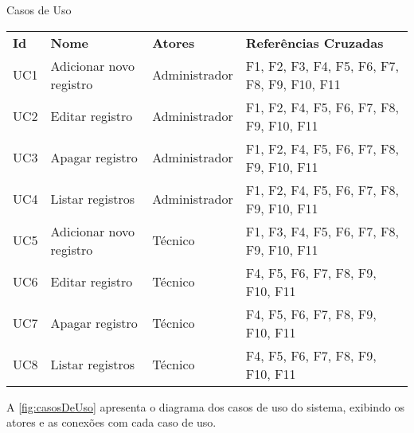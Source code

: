 \begin{tabframed}[htb]
  \caption{Casos de Uso}
  \label{quad:casosDeUso}
  \renewcommand{\arraystretch}{1.5}
  \begin{tabular}{|l|l|l|l|}
    \cline{1-4}
    \textbf{Id}             &
    \textbf{Nome}           &
    \textbf{Atores}         &
    \textbf{Referências Cruzadas}
    \\

    \cline{1-4}
    UC1                     &
    Adicionar novo registro &
    Administrador           &
    F1, F2, F3, F4, F5, F6, F7, F8, F9, F10, F11
    \\

    \cline{1-4}
    UC2                     &
    Editar registro         &
    Administrador           &
    F1, F2, F4, F5, F6, F7, F8, F9, F10, F11
    \\

    \cline{1-4}
    UC3                     &
    Apagar registro         &
    Administrador           &
    F1, F2, F4, F5, F6, F7, F8, F9, F10, F11
    \\

    \cline{1-4}
    UC4                     &
    Listar registros        &
    Administrador           &
    F1, F2, F4, F5, F6, F7, F8, F9, F10, F11
    \\

    \cline{1-4}
    UC5                     &
    Adicionar novo registro &
    Técnico                 &
    F1, F3, F4, F5, F6, F7, F8, F9, F10, F11
    \\

    \cline{1-4}
    UC6                     &
    Editar registro         &
    Técnico                 &
    F4, F5, F6, F7, F8, F9, F10, F11
    \\

    \cline{1-4}
    UC7                     &
    Apagar registro         &
    Técnico                 &
    F4, F5, F6, F7, F8, F9, F10, F11
    \\

    \cline{1-4}
    UC8                     &
    Listar registros        &
    Técnico                 &
    F4, F5, F6, F7, F8, F9, F10, F11
    \\

    \cline{1-4}
  \end{tabular}
  \fonte{} %
\end{tabframed}

A \autoref{fig:casosDeUso} apresenta o diagrama dos casos de uso do sistema, exibindo os atores e as conexões com cada caso de uso.

